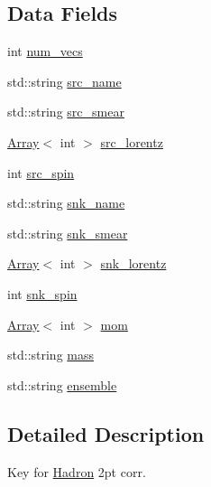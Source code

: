 \subsection*{Data Fields}
\begin{DoxyCompactItemize}
\item 
int \mbox{\hyperlink{structFF_1_1KeyHadron2PtCorr__t_a1511ee045f873cf0c04d763a79c81254}{num\+\_\+vecs}}
\item 
std\+::string \mbox{\hyperlink{structFF_1_1KeyHadron2PtCorr__t_a5d1d30144384ebdfc82e725835245bed}{src\+\_\+name}}
\item 
std\+::string \mbox{\hyperlink{structFF_1_1KeyHadron2PtCorr__t_a1737b7df94def3fddeaa347d8374f91a}{src\+\_\+smear}}
\item 
\mbox{\hyperlink{classXMLArray_1_1Array}{Array}}$<$ int $>$ \mbox{\hyperlink{structFF_1_1KeyHadron2PtCorr__t_acddd5d0d6ec97de524d479b1edb16a14}{src\+\_\+lorentz}}
\item 
int \mbox{\hyperlink{structFF_1_1KeyHadron2PtCorr__t_a1342253cc1dd2982124bf3e04e478ff6}{src\+\_\+spin}}
\item 
std\+::string \mbox{\hyperlink{structFF_1_1KeyHadron2PtCorr__t_a3960ba83a6cfe6e893f12e922ccfe44d}{snk\+\_\+name}}
\item 
std\+::string \mbox{\hyperlink{structFF_1_1KeyHadron2PtCorr__t_ac2bcfc5d0ef2ff56d5772813343eaaa3}{snk\+\_\+smear}}
\item 
\mbox{\hyperlink{classXMLArray_1_1Array}{Array}}$<$ int $>$ \mbox{\hyperlink{structFF_1_1KeyHadron2PtCorr__t_a4efbdec25963b13b5b38059dc2c45235}{snk\+\_\+lorentz}}
\item 
int \mbox{\hyperlink{structFF_1_1KeyHadron2PtCorr__t_acbcafea645c84daf3e6b09bb895e62ec}{snk\+\_\+spin}}
\item 
\mbox{\hyperlink{classXMLArray_1_1Array}{Array}}$<$ int $>$ \mbox{\hyperlink{structFF_1_1KeyHadron2PtCorr__t_ac80ca9543237f146b9f9adaff21919df}{mom}}
\item 
std\+::string \mbox{\hyperlink{structFF_1_1KeyHadron2PtCorr__t_ac2a83ff1faf7b3c0eb6939fedfc68bc6}{mass}}
\item 
std\+::string \mbox{\hyperlink{structFF_1_1KeyHadron2PtCorr__t_a9585f399b6f3f4989c3f798e90067a44}{ensemble}}
\end{DoxyCompactItemize}


\subsection{Detailed Description}
Key for \mbox{\hyperlink{namespaceHadron}{Hadron}} 2pt corr. 

